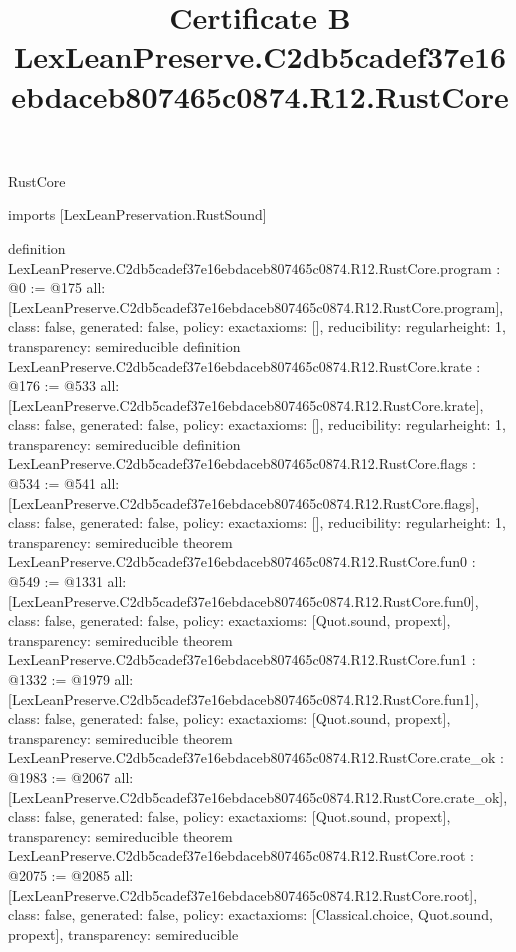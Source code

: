 \begin{lexlean}{RustCore}
\title{Certificate B LexLeanPreserve.C2db5cadef37e16ebdaceb807465c0874.R12.RustCore}
\begin{coremodule}
imports [LexLeanPreservation.RustSound]

definition LexLeanPreserve.C2db5cadef37e16ebdaceb807465c0874.R12.RustCore.program : @0 := @175 {
  all: [LexLeanPreserve.C2db5cadef37e16ebdaceb807465c0874.R12.RustCore.program],
  class: false,
  generated: false,
  policy: exact{axioms: []},
  reducibility: regular{height: 1},
  transparency: semireducible
}
definition LexLeanPreserve.C2db5cadef37e16ebdaceb807465c0874.R12.RustCore.krate : @176 := @533 {
  all: [LexLeanPreserve.C2db5cadef37e16ebdaceb807465c0874.R12.RustCore.krate],
  class: false,
  generated: false,
  policy: exact{axioms: []},
  reducibility: regular{height: 1},
  transparency: semireducible
}
definition LexLeanPreserve.C2db5cadef37e16ebdaceb807465c0874.R12.RustCore.flags : @534 := @541 {
  all: [LexLeanPreserve.C2db5cadef37e16ebdaceb807465c0874.R12.RustCore.flags],
  class: false,
  generated: false,
  policy: exact{axioms: []},
  reducibility: regular{height: 1},
  transparency: semireducible
}
theorem LexLeanPreserve.C2db5cadef37e16ebdaceb807465c0874.R12.RustCore.fun0 : @549 := @1331 {
  all: [LexLeanPreserve.C2db5cadef37e16ebdaceb807465c0874.R12.RustCore.fun0],
  class: false,
  generated: false,
  policy: exact{axioms: [Quot.sound, propext]},
  transparency: semireducible
}
theorem LexLeanPreserve.C2db5cadef37e16ebdaceb807465c0874.R12.RustCore.fun1 : @1332 := @1979 {
  all: [LexLeanPreserve.C2db5cadef37e16ebdaceb807465c0874.R12.RustCore.fun1],
  class: false,
  generated: false,
  policy: exact{axioms: [Quot.sound, propext]},
  transparency: semireducible
}
theorem LexLeanPreserve.C2db5cadef37e16ebdaceb807465c0874.R12.RustCore.crate_ok : @1983 := @2067 {
  all: [LexLeanPreserve.C2db5cadef37e16ebdaceb807465c0874.R12.RustCore.crate_ok],
  class: false,
  generated: false,
  policy: exact{axioms: [Quot.sound, propext]},
  transparency: semireducible
}
theorem LexLeanPreserve.C2db5cadef37e16ebdaceb807465c0874.R12.RustCore.root : @2075 := @2085 {
  all: [LexLeanPreserve.C2db5cadef37e16ebdaceb807465c0874.R12.RustCore.root],
  class: false,
  generated: false,
  policy: exact{axioms: [Classical.choice, Quot.sound, propext]},
  transparency: semireducible
}


\end{coremodule}
\end{lexlean}
